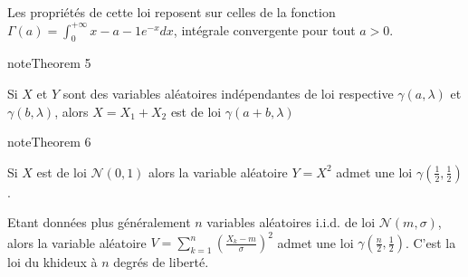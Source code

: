 \documentclass[letterpaper,10pt,french]{sphinxmanual}
\begin{document}
\sphinxAtStartPar
Les propriétés de cette loi reposent sur celles de la fonction \(\Gamma(a) = \int_0^{+\infty} x-{a-1}e^{-x}dx\), intégrale convergente pour tout \(a>0\).
\label{elemstats:theorem-11}
\begin{sphinxadmonition}{note}{Theorem 5}



\sphinxAtStartPar
Si \(X\) et \(Y\) sont des variables aléatoires indépendantes de loi respective \(\gamma(a,\lambda)\) et \(\gamma(b,\lambda)\), alors \(X=X_1+X_2\) est de loi \(\gamma(a+b,\lambda)\)
\end{sphinxadmonition}
\label{elemstats:theorem-12}
\begin{sphinxadmonition}{note}{Theorem 6}



\sphinxAtStartPar
Si \(X\) est de loi \(\mathcal{N}(0,1)\) alors la variable aléatoire \(Y=X^2\) admet une loi \(\gamma(\frac12,\frac12)\).

\sphinxAtStartPar
Etant données plus généralement \(n\) variables aléatoires i.i.d. de loi \(\mathcal{N}(m,\sigma)\), alors  la variable aléatoire \(V=\displaystyle\sum_{k=1}^n \left (\frac{X_k-m}{\sigma}\right )^2\) admet une loi \(\gamma(\frac{n}{2},\frac12)\). C’est la loi du khi\sphinxhyphen{}deux à \(n\) degrés de liberté.
\end{sphinxadmonition}
\end{document}
